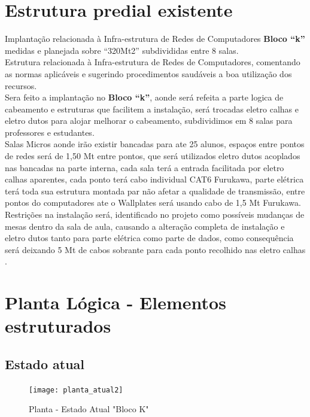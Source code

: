 \documentclass[	DIV=calc,%
paper=a4,%
fontsize=12pt,%
onecolumn]{scrartcl}	 					%
\begin{document}
	\section{Estrutura predial existente}
	
	Implantação relacionada à Infra-estrutura de Redes de Computadores \textbf{Bloco “k”} medidas e planejada sobre “320Mt2” subdivididas entre 8 salas.
	\\
	Estrutura relacionada à Infra-estrutura de Redes de Computadores, comentando as normas aplicáveis e sugerindo procedimentos saudáveis a boa utilização dos recursos.
	\\
	Sera feito a implantação no \textbf{Bloco “k”}, aonde será refeita a parte logica de cabeamento e estruturas que facilitem a instalação, será trocadas eletro calhas e eletro dutos para alojar melhorar o cabeamento, subdividimos em 8 salas para professores e estudantes.
	\\
	Salas Micros aonde irão existir bancadas para ate 25 alunos, espaços entre pontos de redes será de 1,50 Mt entre pontos, que será utilizados eletro dutos acoplados nas bancadas na parte interna, cada sala terá a entrada facilitada por eletro calhas aparentes, cada ponto terá cabo individual CAT6 Furukawa, parte elétrica terá toda sua estrutura montada par não afetar a qualidade de transmissão, entre pontos do computadores  ate o Wallplates será usando cabo de 1,5 Mt Furukawa. 
	\\
	Restrições na instalação será, identificado no projeto como possíveis mudanças de mesas dentro da sala de aula, causando a alteração completa de instalação e eletro dutos tanto para parte elétrica como parte de dados, como consequência será deixando 5 Mt de cabos sobrante para cada ponto recolhido nas eletro calhas .
	
	\section{Planta Lógica - Elementos estruturados}
	
	\subsection{Estado atual}
	\begin{figure}
		\centering
		\caption{Planta - Estado Atual "Bloco K"}
		\texttt{[image: planta\_atual2]}
	\end{figure}
	
\end{document}
